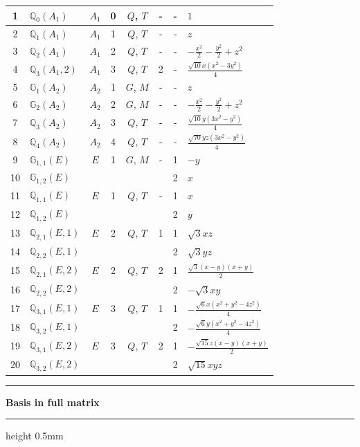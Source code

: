 \documentclass[fleqn,10pt,landscape]{jsarticle}
\begin{document}
\begin{longtable}[l]{clcccccl}
1 & $\mathbb{Q}_{0}(A_{1})$ & $A_{1}$ & 0 & $Q$, $T$ & - & - & $1$ \\ \hline
2 & $\mathbb{Q}_{1}(A_{1})$ & $A_{1}$ & 1 & $Q$, $T$ & - & - & $z$ \\ \hline
3 & $\mathbb{Q}_{2}(A_{1})$ & $A_{1}$ & 2 & $Q$, $T$ & - & - & $- \frac{x^{2}}{2} - \frac{y^{2}}{2} + z^{2}$ \\ \hline
4 & $\mathbb{Q}_{3}(A_{1},2)$ & $A_{1}$ & 3 & $Q$, $T$ & 2 & - & $\frac{\sqrt{10} x \left(x^{2} - 3 y^{2}\right)}{4}$ \\ \hline
5 & $\mathbb{G}_{1}(A_{2})$ & $A_{2}$ & 1 & $G$, $M$ & - & - & $z$ \\ \hline
6 & $\mathbb{G}_{2}(A_{2})$ & $A_{2}$ & 2 & $G$, $M$ & - & - & $- \frac{x^{2}}{2} - \frac{y^{2}}{2} + z^{2}$ \\ \hline
7 & $\mathbb{Q}_{3}(A_{2})$ & $A_{2}$ & 3 & $Q$, $T$ & - & - & $\frac{\sqrt{10} y \left(3 x^{2} - y^{2}\right)}{4}$ \\ \hline
8 & $\mathbb{Q}_{4}(A_{2})$ & $A_{2}$ & 4 & $Q$, $T$ & - & - & $\frac{\sqrt{70} y z \left(3 x^{2} - y^{2}\right)}{4}$ \\ \hline
9 & $\mathbb{G}_{1,1}(E)$ & $E$ & 1 & $G$, $M$ & - & 1 & $- y$ \\
10 & $\mathbb{G}_{1,2}(E)$ &  &  &  &  & 2 & $x$ \\ \hline
11 & $\mathbb{Q}_{1,1}(E)$ & $E$ & 1 & $Q$, $T$ & - & 1 & $x$ \\
12 & $\mathbb{Q}_{1,2}(E)$ &  &  &  &  & 2 & $y$ \\ \hline
13 & $\mathbb{Q}_{2,1}(E,1)$ & $E$ & 2 & $Q$, $T$ & 1 & 1 & $\sqrt{3} x z$ \\
14 & $\mathbb{Q}_{2,2}(E,1)$ &  &  &  &  & 2 & $\sqrt{3} y z$ \\ \hline
15 & $\mathbb{Q}_{2,1}(E,2)$ & $E$ & 2 & $Q$, $T$ & 2 & 1 & $\frac{\sqrt{3} \left(x - y\right) \left(x + y\right)}{2}$ \\
16 & $\mathbb{Q}_{2,2}(E,2)$ &  &  &  &  & 2 & $- \sqrt{3} x y$ \\ \hline
17 & $\mathbb{Q}_{3,1}(E,1)$ & $E$ & 3 & $Q$, $T$ & 1 & 1 & $- \frac{\sqrt{6} x \left(x^{2} + y^{2} - 4 z^{2}\right)}{4}$ \\
18 & $\mathbb{Q}_{3,2}(E,1)$ &  &  &  &  & 2 & $- \frac{\sqrt{6} y \left(x^{2} + y^{2} - 4 z^{2}\right)}{4}$ \\ \hline
19 & $\mathbb{Q}_{3,1}(E,2)$ & $E$ & 3 & $Q$, $T$ & 2 & 1 & $- \frac{\sqrt{15} z \left(x - y\right) \left(x + y\right)}{2}$ \\
20 & $\mathbb{Q}_{3,2}(E,2)$ &  &  &  &  & 2 & $\sqrt{15} x y z$ \\
\end{longtable}
\vspace{5mm}
\noindent \rule[0.5mm]{5mm}{0.5mm}\hspace{3mm}\textbf{Basis in full matrix}\hspace{3mm}\leaders\hrule height 0.5mm\hfill\kern0pt
\vspace{3mm}
\end{document}
